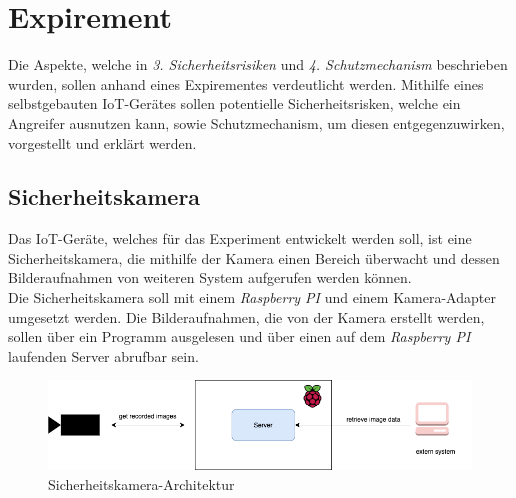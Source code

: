 \section{Expirement}
Die Aspekte, welche in \textit{3. Sicherheitsrisiken} und \textit{4. Schutzmechanism} beschrieben wurden, sollen anhand
eines Expirementes verdeutlicht werden. Mithilfe eines selbstgebauten IoT-Gerätes sollen potentielle Sicherheitsrisken, 
welche ein Angreifer ausnutzen kann, sowie Schutzmechanism, um diesen entgegenzuwirken, vorgestellt und erklärt werden.

\subsection{Sicherheitskamera}
Das IoT-Geräte, welches für das Experiment entwickelt werden soll, ist eine Sicherheitskamera, die mithilfe der Kamera
einen Bereich überwacht und dessen Bilderaufnahmen von  weiteren System aufgerufen werden können. \\

Die Sicherheitskamera soll mit einem \textit{Raspberry PI} und einem Kamera-Adapter umgesetzt werden.
Die Bilderaufnahmen, die von der Kamera erstellt werden, sollen über ein Programm ausgelesen und über
einen auf dem \textit{Raspberry PI} laufenden Server abrufbar sein. \\

	\begin{figure}[h]
		\centering
		\includegraphics[width=145mm]{images/raspberrypi.png}
		\caption{Sicherheitskamera-Architektur}
		\label{fig:arch-raspberrypi}
	\end{figure}